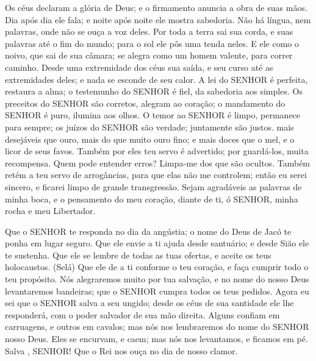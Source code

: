 
{\PP 
  Os céus declaram a glória de Deus; e o firmamento anuncia a obra de suas mãos.
  Dia após dia ele fala; e noite após noite ele mostra sabedoria.
  Não há língua, nem palavras, onde não se ouça a voz deles.
  Por toda a terra sai sua corda, e suas palavras até o fim do mundo; para o sol ele pôs uma tenda neles.
  E ele
{} como o noivo, que sai de sua câmara;
{} se alegra como um homem valente, para correr
{} caminho.
  Desde uma extremidade dos céus
{} sua saída, e seu curso até as
{} extremidades deles; e nada se esconde de seu calor.
  A lei do SENHOR é perfeita,
{} restaura a alma; o testemunho do SENHOR é fiel,
{} da sabedoria aos simples.
  Os preceitos do SENHOR são corretos,
{} alegram ao coração; o mandamento do SENHOR é puro,
{} ilumina aos olhos.
  O temor ao SENHOR é limpo,
{} permanece para sempre; os juízos do SENHOR são verdade; juntamente são justos.
   mais desejáveis que ouro, mais do que muito ouro fino; e mais doces que o mel, e o licor de seus favos.
  Também por eles teu servo é advertido; por guardá-los,
{} muita recompensa.
  Quem pode entender
{} erros? Limpa-me dos que
{} são ocultos.
  Também retém a teu servo de arrogâncias, para que elas não me controlem; então eu serei sincero, e ficarei limpo de grande transgressão.
  Sejam agradáveis as palavras de minha boca, e o pensamento do meu coração, diante de ti, ó SENHOR, minha rocha e meu Libertador.
\par }


{\PP 
  Que o SENHOR te responda no dia da angústia; o nome do Deus de Jacó te ponha em lugar seguro.
  Que ele envie a ti ajuda desde
{} santuário; e desde Sião ele te sustenha.
  Que ele se lembre de todas as tuas ofertas, e aceite os teus holocaustos. (Selá)
  Que ele de a ti conforme o teu coração, e faça cumprir todo o teu propósito.
  Nós alegraremos muito por tua salvação, e no nome do nosso Deus levantaremos bandeiras; que o SENHOR cumpra todos os teus pedidos.
  Agora eu sei que o SENHOR salva a seu ungido; desde os céus de sua santidade ele lhe responderá, com o poder salvador de sua mão direita.
  Alguns confiam em carruagens, e outros em cavalos; mas nós nos lembraremos do nome do SENHOR nosso Deus.
  Eles se encurvam, e caem; mas nós nos levantamos, e ficamos em pé.
  Salva
{}, SENHOR! Que o Rei nos ouça no dia de nosso clamor.
\par }

